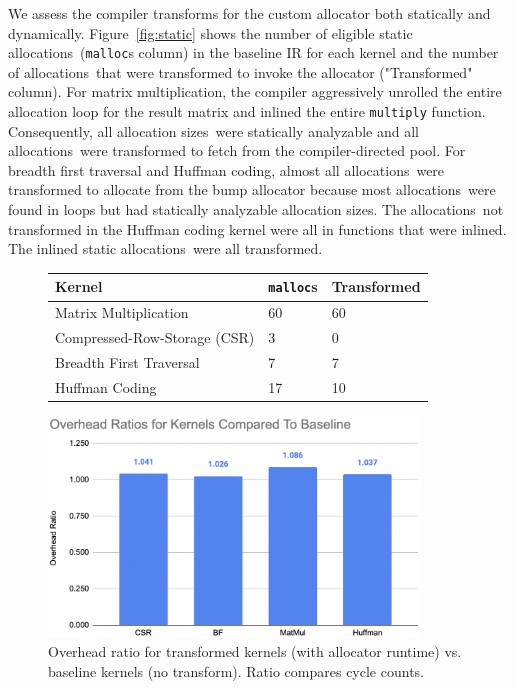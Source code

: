 \documentclass{article}
\def\ALLS{allocations}
\def\SIZES{allocation sizes}
\begin{document}
We assess the compiler transforms for the custom allocator both statically and dynamically. Figure~\ref{fig:static}
shows the number of eligible static \ALLS\ (\texttt{malloc}s column) in the baseline IR for each kernel and 
the number of \ALLS\ that were transformed to invoke the allocator ("Transformed" column). For matrix 
multiplication, the compiler aggressively unrolled the entire allocation loop for the result matrix
and inlined the entire \texttt{multiply} function. Consequently, all \SIZES\ were statically analyzable
and all \ALLS\ were transformed to fetch from the compiler-directed pool. For breadth first traversal and Huffman 
coding, almost all \ALLS\ were transformed to allocate from the bump allocator because most \ALLS\
were found in loops but had statically analyzable \SIZES . The \ALLS\ not transformed in
the Huffman coding kernel were all in functions that were inlined. The inlined static \ALLS\ were
all transformed.

\begin{figure}[htp]
    \centering
    \begin{minipage}{0.45\textwidth}
        \small
        \centering
        \begin{tabular}{ | m{5cm} | m{1cm} | m{2cm} | } 
          \hline
            Kernel & \texttt{malloc}s & Transformed \\
          \hline\hline
            Matrix Multiplication & 60 & 60 \\ 
          \hline
            Compressed-Row-Storage (CSR) & 3 & 0 \\ 
          \hline
            Breadth First Traversal & 7 & 7  \\ 
          \hline
            Huffman Coding & 17 & 10 \\ 
          \hline
        \end{tabular}
        \caption{Number of static allocations transformed.}
        \label{fig:static}
    \end{minipage}\hfill
    \begin{minipage}{0.45\textwidth}
        \centering
        \includegraphics[width=0.88\textwidth]{figs/graph.png} 
        \caption{Overhead ratio for transformed kernels (with allocator runtime)
        vs. baseline kernels (no transform). Ratio compares cycle counts.}  
	    \label{fig:perf}
    \end{minipage}\hfill
\end{figure}
\end{document}
